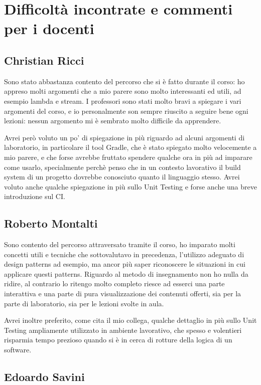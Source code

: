 \section{Difficoltà incontrate e commenti per i docenti}

\subsection{Christian Ricci}

Sono stato abbastanza contento del percorso che si è fatto durante il corso: ho appreso molti argomenti che a mio parere sono molto interessanti ed utili, ad esempio lambda e stream. I professori sono stati molto bravi a spiegare i vari argomenti del corso, e io personalmente son sempre riuscito a seguire bene ogni lezioni: nessun argomento mi è sembrato molto difficile da apprendere.

Avrei però voluto un po' di spiegazione in più riguardo ad alcuni argomenti di laboratorio, in particolare il tool Gradle, che è stato spiegato molto velocemente a mio parere, e che forse avrebbe fruttato spendere qualche ora in più ad imparare come usarlo, specialmente perchè penso che in un contesto lavorativo il build system di un progetto dovrebbe conosciuto quanto il linguaggio stesso. Avrei voluto anche qualche spiegazione in più sullo Unit Testing e forse anche una breve introduzione sul CI.

\subsection{Roberto Montalti}

Sono contento del percorso attraversato tramite il corso, ho imparato molti concetti utili e tecniche che sottovalutavo in precedenza, l'utilizzo adeguato di design patterns ad esempio, ma ancor più 
saper riconoscere le situazioni in cui applicare questi patterns.
Riguardo al metodo di insegnamento non ho nulla da ridire, al contrario lo ritengo molto completo riesce ad esserci una parte interattiva e una parte di pura visualizzazione dei contenuti offerti, sia per la parte di laboratorio, sia per le lezioni svolte in aula. 

Avrei inoltre preferito, come cita il mio collega, qualche dettaglio in più sullo Unit Testing ampliamente utilizzato in ambiente lavorativo, che spesso e volentieri risparmia tempo prezioso quando si è in cerca di rotture della logica di un software.

\subsection{Edoardo Savini}

